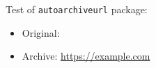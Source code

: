\documentclass{article}
\begin{document}
Test of \texttt{autoarchiveurl} package:

\makeatletter
\begin{itemize}
  \item Original: 
  \item Archive:  \url{https://example.com}
\end{itemize}
\makeatother
\end{document}

